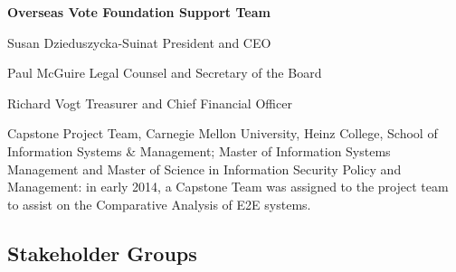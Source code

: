 \textbf{Overseas Vote Foundation Support Team}

Susan Dzieduszycka-Suinat
President and CEO
 
Paul McGuire
Legal Counsel and Secretary of the Board
 
Richard Vogt
Treasurer and Chief Financial Officer

Capstone Project Team, Carnegie Mellon University, Heinz College,
School of Information Systems \& Management; Master of Information
Systems Management and Master of Science in Information Security
Policy and Management: in early 2014, a Capstone Team was assigned to
the project team to assist on the Comparative Analysis of E2E systems.

\subsection{Stakeholder Groups}
\label{sec:stakeholder-groups}

